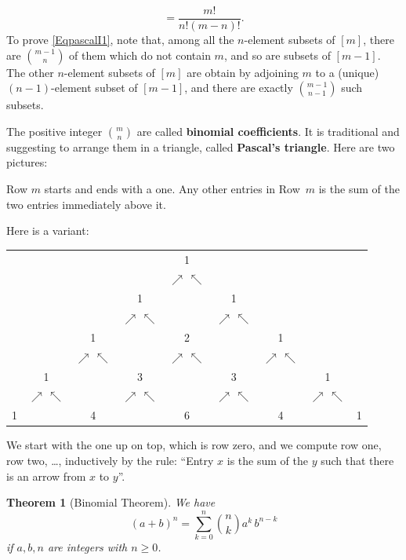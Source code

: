 \documentclass[12pt,letterpaper]{article}
\newcommand{\aq}{\ensuremath{\nearrow\,\nwarrow}}
\newtheorem{thm}{Theorem}%
\theoremstyle{definition}
\begin{document}
$$
=\frac{m!}{n!(m-n)!}.
$$ 
To prove \eqref{EqpascalI1}, note that, among all the $n$-element subsets of $[m]$, there are $\binom{m-1}{n}$ of them which do not contain $m$, and so are subsets of $[m-1]$. The other $n$-element subsets of $[m]$ are obtain by adjoining $m$ to a (unique) $(n-1)$-element subset of $[m-1]$, and there are exactly $\binom{m-1}{n-1}$ such subsets. 

The positive integer $\binom{m}{n}$ are called \textbf{binomial coefficients}.  It is traditional and suggesting to arrange them in a triangle, called \textbf{Pascal's triangle}. Here are two pictures: 

\begin{center}
 \qquad 
{}
\end{center} 
Row $m$ starts and ends with a one. Any other entries in Row~$m$ is the sum of the two entries immediately above it. 

Here is a variant: 

\begin{table}[htbp]
\centering
\setlength{\tabcolsep}{0pt}
\begin{tabular}{ccccccccc}
  &     &     &      & 1   &      &      &     & \\
  &     &     &      & \aq &      &      &     & \\
  &     &     & 1    &     &  1   &      &     & \\
  &     &     & \aq  &     &  \aq &      &     & \\
  &     & 1   &      & 2   &      & 1    &     & \\
  &     & \aq &      & \aq &      & \aq  &     & \\
  & 1   &     & 3    &     &  3   &      & 1   & \\
  &\aq  &     & \aq  &     &  \aq &      & \aq & \\
1 &     & 4   &      & 6   &      & 4    &     & 1
\end{tabular}
\end{table}
We start with the one up on top, which is row zero, and we compute row one, row two, \ldots, inductively by the rule: ``Entry $x$ is the sum of the $y$ such that there is an arrow from $x$ to $y$''. 

\begin{thm}[Binomial Theorem]\label{Tbt}
We have 
$$
(a+b)^n=\sum_{k=0}^n \binom{n}{k} a^k\, b^{n-k}
$$ 
if $a,b,n$ are integers with $n\ge 0$. 
\end{thm}
\end{document}
